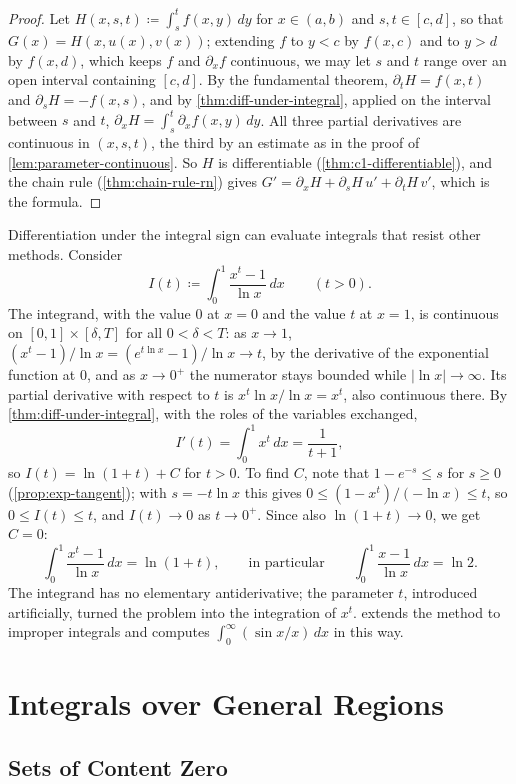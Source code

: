 \begin{proof}
Let $H(x,s,t)\coloneqq\int_s^tf(x,y)\,dy$ for $x\in(a,b)$ and $s,t\in[c,d]$, so that $G(x)=H(x,u(x),v(x))$; extending $f$ to $y<c$ by $f(x,c)$ and to $y>d$ by $f(x,d)$, which keeps $f$ and $\partial_xf$ continuous, we may let $s$ and $t$ range over an open interval containing $[c,d]$. By the fundamental theorem, $\partial_tH=f(x,t)$ and $\partial_sH=-f(x,s)$, and by \cref{thm:diff-under-integral}, applied on the interval between $s$ and $t$, $\partial_xH=\int_s^t\partial_xf(x,y)\,dy$. All three partial derivatives are continuous in $(x,s,t)$, the third by an estimate as in the proof of \cref{lem:parameter-continuous}. So $H$ is differentiable (\cref{thm:c1-differentiable}), and the chain rule (\cref{thm:chain-rule-rn}) gives $G'=\partial_xH+\partial_sH\,u'+\partial_tH\,v'$, which is the formula.
\end{proof}

Differentiation under the integral sign can evaluate integrals that resist other methods. Consider
\[
I(t)\coloneqq\int_0^1\frac{x^t-1}{\ln x}\,dx\qquad(t>0).
\]
The integrand, with the value $0$ at $x=0$ and the value $t$ at $x=1$, is continuous on $[0,1]\times[\delta,T]$ for all $0<\delta<T$: as $x\to1$, $(x^t-1)/\ln x=(e^{t\ln x}-1)/\ln x\to t$, by the derivative of the exponential function at $0$, and as $x\to0^+$ the numerator stays bounded while $|\ln x|\to\infty$. Its partial derivative with respect to $t$ is $x^t\ln x/\ln x=x^t$, also continuous there. By \cref{thm:diff-under-integral}, with the roles of the variables exchanged,
\[
I'(t)=\int_0^1x^t\,dx=\frac1{t+1},
\]
so $I(t)=\ln(1+t)+C$ for $t>0$. To find $C$, note that $1-e^{-s}\le s$ for $s\ge0$ (\cref{prop:exp-tangent}); with $s=-t\ln x$ this gives $0\le(1-x^t)/(-\ln x)\le t$, so $0\le I(t)\le t$, and $I(t)\to0$ as $t\to0^+$. Since also $\ln(1+t)\to0$, we get $C=0$:
\[
\int_0^1\frac{x^t-1}{\ln x}\,dx=\ln(1+t),\qquad\text{in particular}\qquad\int_0^1\frac{x-1}{\ln x}\,dx=\ln2 .
\]
The integrand has no elementary antiderivative; the parameter $t$, introduced artificially, turned the problem into the integration of $x^t$.  extends the method to improper integrals and computes $\int_0^\infty(\sin x/x)\,dx$ in this way.

\section{Integrals over General Regions}
\label{sec:general-regions}

\subsection{Sets of Content Zero}

